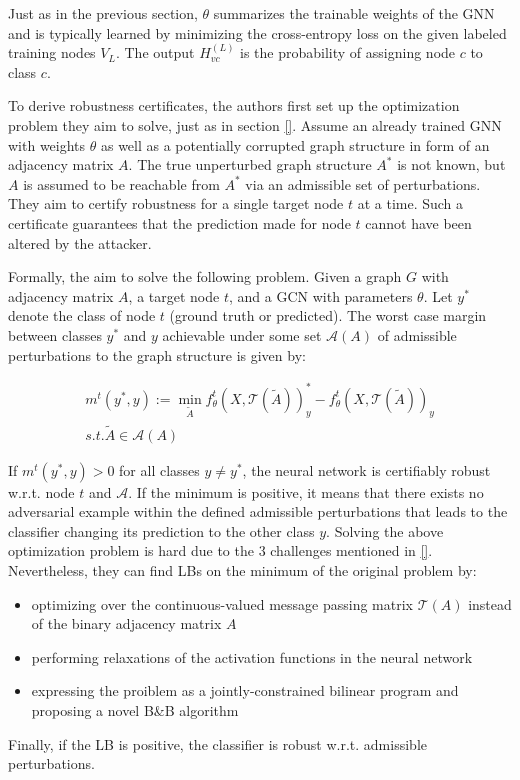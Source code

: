 \documentclass[a4paper,preprint]{sig-alternate}
\begin{document}
Just as in the previous section, $\theta$ summarizes the trainable weights of the GNN and is typically learned
by minimizing the cross-entropy loss on the given labeled training nodes $V_L$. The output $H_{vc}^(L)$ is the probability
of assigning node $c$ to class $c$.\newline

To derive robustness certificates, the authors first set up the optimization problem they aim to solve, just
as in section \ref{}. Assume an already trained GNN with weights $\theta$ as well as a potentially corrupted graph
structure in form of an adjacency matrix $A$. The true unperturbed graph structure $A^{\ast}$ is not known, but $A$ is
assumed to be reachable from $A^{\ast}$ via an admissible set of perturbations. They aim to certify robustness for a
single target node $t$ at a time. Such a certificate guarantees that the prediction made for node $t$ cannot have been
altered by the attacker.\newline

Formally, the aim to solve the following problem.\newline
Given a graph $G$ with adjacency matrix $A$, a target node $t$, and a GCN with parameters $\theta$. Let $y^{\ast}$
denote the class of node $t$ (ground truth or predicted). The worst case margin between classes $y^{\ast}$ and $y$
achievable under some set $\mathcal{A}(A)$ of admissible perturbations to the graph structure is given by:

\begin{gather}
    m^t (y^{\ast}, y) := \min_{\tilde{A}} f_{\theta}^t (X, \mathcal{T}(\tilde{A}))_y^{\ast}
    - f_{\theta}^t (X, \mathcal{T}(\tilde{A}))_y \\
    s.t. \tilde{A} \in \mathcal{A}(A)
\end{gather}

If $m^t (y^{\ast}, y) > 0$ for all classes $y \neq y^{\ast}$, the neural network is certifiably robust w.r.t. node $t$
and $\mathcal{A}$. If the minimum is positive, it means that there exists no adversarial example within the defined
admissible perturbations that leads to the classifier changing its prediction to the other class $y$.
Solving the above optimization problem is hard due to the $3$ challenges mentioned in \ref{}.
Nevertheless, they can find LBs on the minimum of the original problem by:
\begin{itemize}
    \item optimizing over the continuous-valued message passing matrix $\mathcal{T}(A)$ instead of the binary
    adjacency matrix $A$
    \item performing relaxations of the activation functions in the neural network
    \item expressing the proiblem as a jointly-constrained bilinear program and proposing a novel B\&B algorithm
\end{itemize}
Finally, if the LB is positive, the classifier is robust w.r.t. admissible perturbations.
\end{document}

